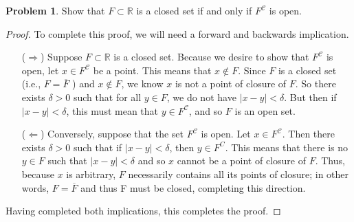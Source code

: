 \documentclass[12pt]{article}
\newcommand{\R}{\mathbb{R}}
\newcommand{\C}{\mathscr{C}}
\theoremstyle{definition}
\newtheorem{problem}{Problem}
\begin{document}
\begin{problem}

    Show that \( F \subset \R \) is a closed set if and only if \( F^{\C} \) is open.

    \begin{proof}

        To complete this proof, we will need a forward and backwards implication. 
        \begin{itemize}
                \item[(\( \Rightarrow \))] Suppose \( F \subset \R \) is a closed set. Because we desire to show that \( F^{\C} \) is open, let \( x \in F^{\C} \) be a point. This means that \( x \not\in F \). Since \( F \) is a closed set (i.e., \( F = \overline{F} \) ) and \( x \not\in F \), we know \( x \) is not a point of closure of \( F \). So there exists \( \delta > 0 \) such that for all \( y \in F \), we do not have \( | x - y| < \delta \). But then if \( |x - y| < \delta \), this must mean that \( y \in F^{\C} \), and so \( F \) is an open set.
            
                \item[(\( \Leftarrow \))] Conversely, suppose that the set \( F^{\C} \) is open. Let \( x \in F^{\C} \). Then there exists \( \delta > 0 \) such that if \( | x - y | < \delta \), then \( y \in F^{C} \). This means that there is no \( y \in F \) such that \(| x-y | < \delta \) and so \( x \) cannot be a point of closure of \( F \). Thus, because \( x \) is arbitrary, \( F \) necessarily contains all its points of closure; in other words, \( F = \overline{F} \) and thus F must be closed, completing this direction.
            \end{itemize}
        Having completed both implications, this completes the proof.
    \end{proof}
    
\end{problem}
\end{document}
